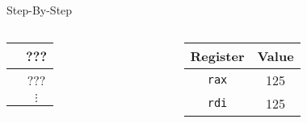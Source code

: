 \documentclass[hyphens,aspectratio=169]{beamer}
\begin{document}
\begin{frame}[fragile]{Step-By-Step}
\begin{columns}
\begin{column}{0.33\textwidth}
{\begin{tabular}{c|c|}
                \hline
                & ??? \\
                \hline
                & ??? \\
                \hline
                & $\vdots$
            \end{tabular}}
        \end{column}
        \begin{column}{0.33\textwidth}
            \begin{tabular}{| c | c |}
                \hline
                Register & Value \\
                \hline
                \texttt{rax} & 125 \\
                \hline
                \texttt{rdi} & 125 \\
                \hline
            \end{tabular}
        \end{column}
    \end{columns}
\end{frame}
\end{document}
